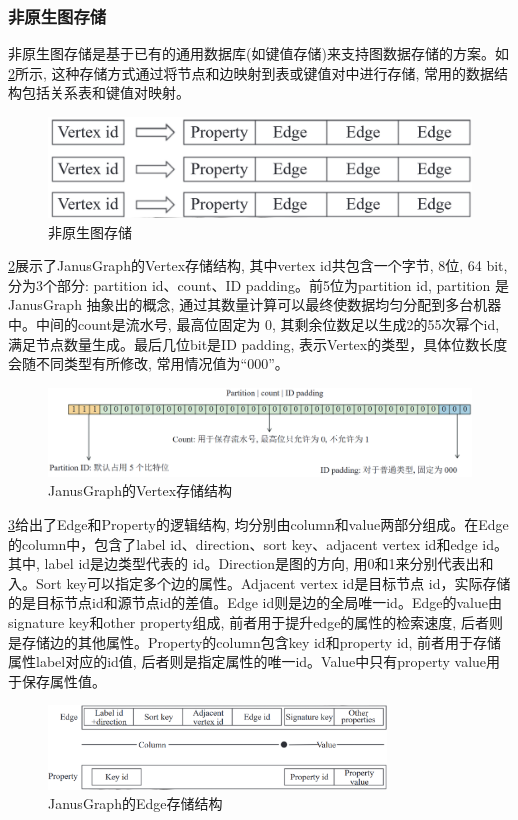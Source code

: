 \subsubsection{非原生图存储}

非原生图存储是基于已有的通用数据库(如键值存储)来支持图数据存储的方案。如\cref{fig:janusgraph-vertex}所示, 这种存储方式通过将节点和边映射到表或键值对中进行存储, 常用的数据结构包括关系表和键值对映射。\begin{figure}[H]
	\centering
	\includegraphics[width=\textwidth]{images/6.png}
	\caption{非原生图存储}
	\label{fig:non-native}
\end{figure}
\cref{fig:janusgraph-vertex}展示了JanusGraph的Vertex存储结构, 其中vertex id共包含一个字节, 8位, 64 bit, 分为3个部分: partition id、count、ID padding。前5位为partition id, partition 是 JanusGraph 抽象出的概念, 通过其数量计算可以最终使数据均匀分配到多台机器中。中间的count是流水号, 最高位固定为 0, 其剩余位数足以生成2的55次幂个id, 满足节点数量生成。最后几位bit是ID padding, 表示Vertex的类型，具体位数长度会随不同类型有所修改, 常用情况值为“000”。\begin{figure}[H]
	\includegraphics[width=1\textwidth]{images/12.png}
	\caption{JanusGraph的Vertex存储结构}
	\label{fig:janusgraph-vertex}
\end{figure}
\cref{fig:janusgraph-edge}给出了Edge和Property的逻辑结构, 均分别由column和value两部分组成。在Edge的column中，包含了label id、direction、sort key、adjacent vertex id和edge id。其中, label id是边类型代表的 id。Direction是图的方向, 用0和1来分别代表出和入。Sort key可以指定多个边的属性。Adjacent vertex id是目标节点 id，实际存储的是目标节点id和源节点id的差值。Edge id则是边的全局唯一id。Edge的value由signature key和other property组成, 前者用于提升edge的属性的检索速度, 后者则是存储边的其他属性。Property的column包含key id和property id, 前者用于存储属性label对应的id值, 后者则是指定属性的唯一id。Value中只有property value用于保存属性值。
\begin{figure}[H]
	\centering
	\includegraphics[width=0.8\textwidth]{images/13.png}
	\caption{JanusGraph的Edge存储结构}
	\label{fig:janusgraph-edge}
\end{figure}

